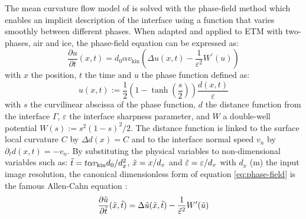 \documentclass[draft,ms]{agujournal2019}
\begin{document}
The mean curvature flow model of  is solved with the phase-field method which enables an implicit description of the interface using a function that varies smoothly between different phases. When adapted and applied to ETM with two-phases, air and ice, the phase-field equation can be expressed as:\\
\begin{equation}\label{eq:phase-field}\frac{\partial u}{\partial t}(x, t)= d_0 \alpha v_{\mathrm{kin}} \left(\Delta u(x, t)-\frac{1}{\varepsilon^{2}} W^{\prime}(u)\right)\end{equation}
\noindent with $x$ the position, $t$ the time and $u$ the phase function defined as: \begin{equation}\label{eq:phase-func}
u(x,t) := \frac{1}{2}\left(1-\tanh\left(\frac{s}{2}\right)\right)\frac{d(x,t)}{\varepsilon}
\end{equation}
with $s$ the curvilinear  abscissa of the phase function, $d$ the distance function from the interface $\Gamma$, $\varepsilon$ the interface sharpness parameter, and $W$ a double-well potential $W(s):= s^{2}(1-s)^{2}/2$. The distance function is linked to the surface local curvature $C$ by $\Delta d(x) = C$ and to the interface normal speed $v_n$ by $\partial_t d (x,t) = - v_n$. By substituting the physical variables to non-dimensional variables such as: $\Tilde{t} = t \alpha v_{\mathrm{kin}} d_0 / d_x^2 $, $\Tilde{x} = x/d_x$ and $\Tilde{\varepsilon} = \varepsilon/d_x$ with $d_x$ (m) the input image resolution, the canonical dimensionless form of equation \ref{eq:phase-field} is the famous Allen-Cahn equation \cite{bretin_and_denis_discrete-continuous_2015, kaempfer_phase-field_2009}:
\begin{equation}\label{eq:allen-cahn}\frac{\partial \Tilde{u}}{\partial \Tilde{t}}(\Tilde{x}, \Tilde{t})=\Delta \Tilde{u}(\Tilde{x}, \Tilde{t})-\frac{1}{\Tilde{\varepsilon}^{2}} W^{\prime}(\Tilde{u})\end{equation}

\end{document}
